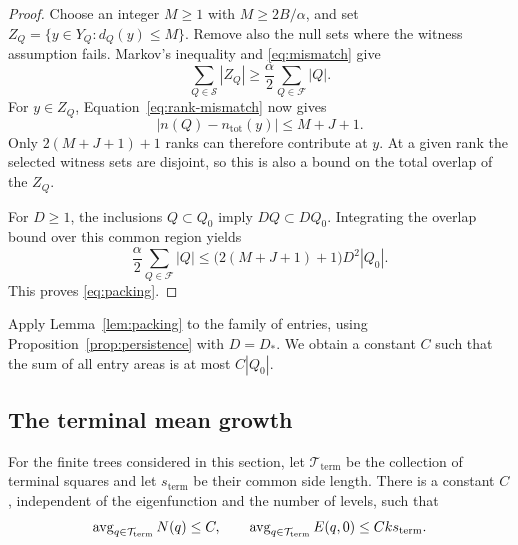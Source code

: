 \begin{proof}
Choose an integer $M\ge1$ with $M\ge2B/\alpha$, and set
$Z_Q=\{y\in Y_Q:d_Q(y)\le M\}$. Remove also the null sets where the
witness assumption fails. Markov's inequality and
\eqref{eq:mismatch} give
\[
 \sum_{Q\in\mathcal S}|Z_Q|
 \ge\frac\alpha2\sum_{Q\in\mathcal F}|Q|.
\]
For $y\in Z_Q$, Equation~\eqref{eq:rank-mismatch} now gives
\[
 |n(Q)-n_{\mathrm{tot}}(y)|\le M+J+1.
\]
Only $2(M+J+1)+1$ ranks can therefore contribute at $y$. At a given
rank the selected witness sets are disjoint, so this is also a bound
on the total overlap of the $Z_Q$.

For $D\ge1$, the inclusions $Q\subset Q_0$ imply $DQ\subset DQ_0$.
Integrating the overlap bound over this common region yields
\[
 \frac\alpha2\sum_{Q\in\mathcal F}|Q|
 \le\bigl(2(M+J+1)+1\bigr)D^2|Q_0|.
\]
This proves \eqref{eq:packing}.
\end{proof}

Apply Lemma~\ref{lem:packing} to the family of entries, using
Proposition~\ref{prop:persistence} with $D=D_*$. We obtain a constant
$C$ such that the sum of all entry areas is at most $C|Q_0|$.

\subsection{The terminal mean growth}

\begin{theorem}
\label{thm:mean-growth}
For the finite trees considered in this section, let
$\mathcal T_{\mathrm{term}}$ be the collection of terminal squares and
let $s_{\mathrm{term}}$ be their common side length. There is a
constant $C$, independent of the eigenfunction and the number of
levels, such that
\begin{equation}
\label{eq:mean-growth}
 \operatorname{avg}_{q\in\mathcal T_{\mathrm{term}}}N(q)\le C,
 \qquad
 \operatorname{avg}_{q\in\mathcal T_{\mathrm{term}}}E(q,0)
      \le Ck s_{\mathrm{term}}.
\end{equation}
\end{theorem}

